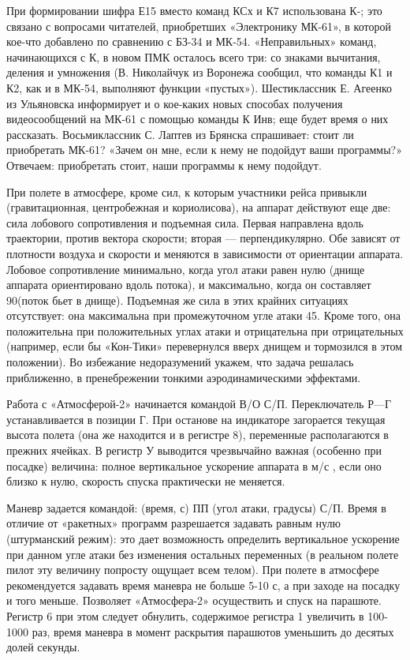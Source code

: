 \documentclass[11pt,a4paper,oneside]{article}
\begin{document}
При формировании шифра Е15 вместо команд КСх и К7 использована К-; это связано с вопросами читателей, приобретших «Электронику МК-61», в которой кое-что добавлено по сравнению с БЗ-34 и МК-54. «Неправильных» команд, начинающихся с К, в новом ПМК осталось всего три: со знаками вычитания, деления и умножения (В. Николайчук из Воронежа сообщил, что команды К1 и К2, как и в МК-54, выполняют функции «пустых»). Шестиклассник Е. Агеенко из Ульяновска информирует и о кое-каких новых способах получения видеосообщений на МК-61 с помощью команды К Инв; еще будет время о них рассказать. Восьмиклассник С. Лаптев из Брянска спрашивает:	стоит ли приобретать МК-61? «Зачем он мне, если к нему не подойдут ваши программы?» Отвечаем: приобретать стоит, наши программы к нему подойдут.

При полете в атмосфере, кроме сил, к которым участники рейса привыкли (гравитационная, центробежная и кориолисова), на аппарат действуют еще две: сила лобового сопротивления и подъемная сила. Первая направлена вдоль траектории, против вектора скорости; вторая — перпендикулярно. Обе зависят от плотности воздуха и скорости и меняются в зависимости от ориентации аппарата. Лобовое сопротивление минимально, когда угол атаки равен нулю (днище аппарата ориентировано вдоль потока), и максимально, когда он составляет 90\degree (поток бьет в днище). Подъемная же сила в этих крайних ситуациях отсутствует: она максимальна при промежуточном угле атаки 45\degree. Кроме того, она положительна при положительных углах атаки и отрицательна при отрицательных (например, если бы «Кон-Тики» перевернулся вверх днищем и тормозился в этом положении). Во избежание недоразумений укажем, что задача решалась приближенно, в пренебрежении тонкими аэродинамическими эффектами.

Работа с «Атмосферой-2» начинается командой В/О С/П. Переключатель Р—Г устанавливается в позиции Г. При останове на индикаторе загорается текущая высота полета (она же находится и в регистре 8), переменные располагаются в прежних ячейках. В регистр У выводится чрезвычайно важная (особенно при посадке) величина: полное вертикальное ускорение аппарата в м/с , если оно близко к нулю, скорость спуска практически не меняется.

Маневр задается командой: (время, с) ПП (угол атаки, градусы) С/П. Время в отличие от «ракетных» программ разрешается задавать равным нулю (штурманский режим): это дает возможность определить вертикальное ускорение при данном угле атаки без изменения остальных переменных (в реальном полете пилот эту величину попросту ощущает всем телом). При полете в атмосфере рекомендуется задавать время маневра не больше 5-10 с, а при заходе на посадку и того меньше. Позволяет «Атмосфера-2» осуществить и спуск на парашюте. Регистр 6 при этом следует обнулить, содержимое регистра 1 увеличить в 100-1000 раз, время маневра в момент раскрытия парашютов уменьшить до десятых долей секунды.
\end{document}
